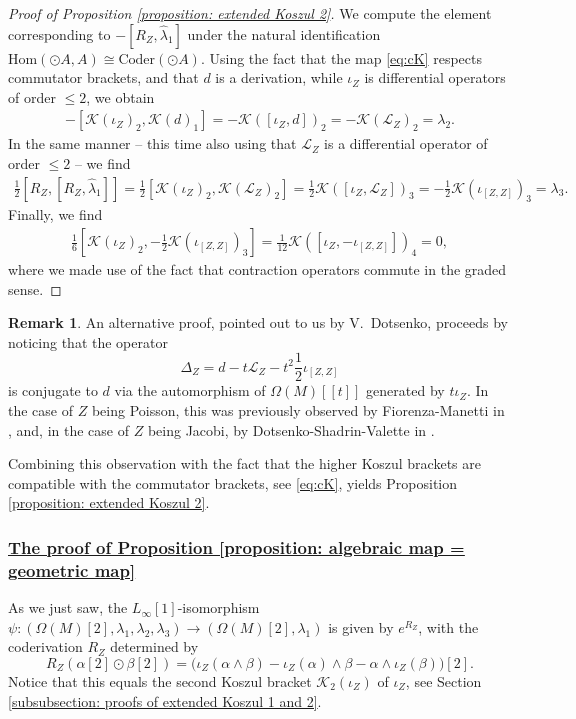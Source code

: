 \documentclass[11pt,thmsa]{amsart}
\theoremstyle{definition}
\newtheorem{remark}[theorem]{Remark}
\newcommand{\Hom}{\mathrm{Hom}}
\newcommand{\Lie}{\mathcal{L}}
\newcommand{\Koszul}{\mathcal{K}}
\newcommand{\Coder}{\mathrm{Coder}}
\begin{document}
{\begin{proof}[Proof of Proposition \ref{proposition: extended Koszul 2}]
We compute the element corresponding to $ - [R_{Z},\widehat{\lambda}_1] $ under the natural identification $\Hom(\odot A,A)\cong \Coder(\odot A)$. 
Using the fact that the map \eqref{eq:cK} respects commutator brackets, and that $d$ is a derivation, while $\iota_Z$ is differential operators of order $\le 2$, we obtain
\begin{eqnarray*}
-[\Koszul(\iota_Z)_2,\Koszul(d)_1]=-\Koszul([\iota_Z,d])_2=-\Koszul(\Lie_Z)_2=\lambda_2.
\end{eqnarray*}
In the same manner -- this time also using that $\Lie_Z$ is a differential operator of order $\le 2$ -- we find
\begin{eqnarray*}
\frac{1}{2}[R_{Z},[R_{Z},\widehat{\lambda}_1]]=\frac{1}{2}[\Koszul(\iota_Z)_2,\Koszul(\Lie_Z)_2]=\frac{1}{2}\Koszul([\iota_Z,\Lie_Z])_3=-\frac{1}{2}\Koszul(\iota_{[Z,Z]})_3=\lambda_3.
\end{eqnarray*}
Finally, we find
\begin{eqnarray*}
\frac{1}{6}[\Koszul(\iota_Z)_2,-\frac{1}{2}\Koszul(\iota_{[Z,Z]})_3]=
\frac{1}{12}\Koszul([\iota_Z,-\iota_{[Z,Z]}])_4
=0,
\end{eqnarray*}
where we made use of the fact that contraction operators 
commute in the graded sense.
\end{proof}

\begin{remark}
{An alternative proof, pointed out to us by V.~Dotsenko, proceeds by noticing that the operator
$$ \Delta_Z=d - t\Lie_Z - t^2\frac{1}{2}\iota_{[Z,Z]}$$
is conjugate to $d$ via the automorphism of $\Omega(M)[[t]]$
generated by $t\iota_Z$. In the case of $Z$ being Poisson,
this was previously observed by Fiorenza-Manetti in \cite{Fiorenza-Manetti},
and, in the case of $Z$ being Jacobi, by Dotsenko-Shadrin-Valette in \cite{DSV}.}

{
Combining this observation with the fact that the higher Koszul brackets 
are compatible with the commutator brackets, see \eqref{eq:cK},
yields Proposition \ref{proposition: extended Koszul 2}.}
\end{remark}

\subsubsection{\underline{The proof of Proposition \ref{proposition: algebraic map = geometric map}}}
\label{subsubsection: proof of algebraic = geometric}

As we just saw, the $L_\infty[1]$-isomorphism
$\psi: (\Omega(M)[2],\lambda_1,\lambda_2,\lambda_3)\to (\Omega(M)[2],\lambda_1)$
is given by $e^{R_Z}$, with the coderivation $R_Z$ determined by
$$ R_Z(\alpha[2]\odot\beta[2]) = \Big(\iota_Z(\alpha\wedge \beta) - \iota_Z(\alpha)\wedge \beta - \alpha\wedge \iota_Z(\beta)\Big)[2].$$
Notice that this equals the second Koszul bracket $\Koszul_2(\iota_Z)$ of $\iota_Z$, see Section \ref{subsubsection: proofs of extended Koszul 1 and 2}.

}
\end{document}
